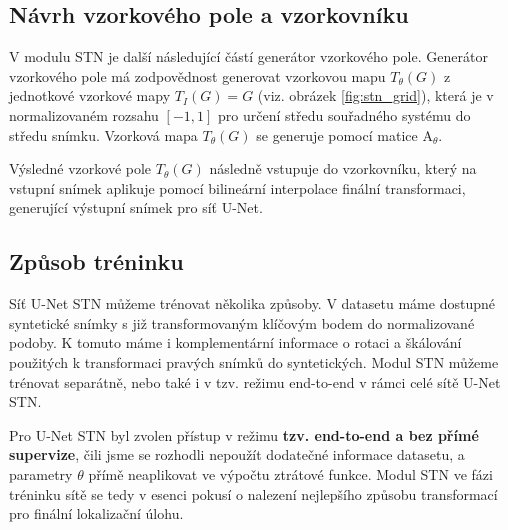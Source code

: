 \subsection{Návrh vzorkového pole a vzorkovníku}

V modulu STN je další následující částí generátor vzorkového pole. Generátor vzorkového pole má zodpovědnost generovat vzorkovou mapu $T_{\theta}(G)$ z jednotkové vzorkové mapy $T_{I}(G) = G$ (viz. obrázek \ref{fig:stn_grid}), která je v normalizovaném rozsahu $[-1, 1]$ pro určení středu souřadného systému do středu snímku. Vzorková mapa $T_{\theta}(G)$ se generuje pomocí matice $\displaystyle \mathrm {A}_\theta$. 

Výsledné vzorkové pole $T_{\theta}(G)$ následně vstupuje do vzorkovníku, který na vstupní snímek aplikuje pomocí bilineární interpolace finální transformaci, generující výstupní snímek pro síť U-Net.

\subsection{Způsob tréninku}

Síť U-Net STN můžeme trénovat několika způsoby. V datasetu máme dostupné syntetické snímky s již transformovaným klíčovým bodem do normalizované podoby. K tomuto máme i komplementární informace o rotaci a škálování použitých k transformaci pravých snímků do syntetických. Modul STN můžeme trénovat separátně, nebo také i v tzv. režimu end-to-end v rámci celé sítě U-Net STN.

Pro U-Net STN byl zvolen přístup v režimu \textbf{tzv. end-to-end a bez přímé supervize}, čili jsme se rozhodli nepoužít dodatečné informace datasetu, a parametry $\theta$ přímě neaplikovat ve výpočtu ztrátové funkce. Modul STN ve fázi tréninku sítě se tedy v esenci pokusí o nalezení nejlepšího způsobu transformací pro finální lokalizační úlohu.

\endinput